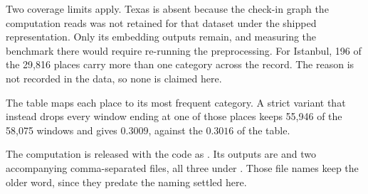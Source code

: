 Two coverage limits apply. Texas is absent because the check-in graph the computation reads was not
retained for that dataset under the shipped representation. Only its embedding outputs remain, and
measuring the benchmark there would require re-running the preprocessing. For Istanbul, 196 of the 29,816 places carry more than one category across the
record. The reason is not recorded in the data, so none is claimed here.
%

The table maps each place to its most frequent category. A strict variant
that instead drops every window ending at one of those places keeps 55,946 of the 58,075 windows
and gives $0.3009$, against the $0.3016$ of the table.

The computation is released with the code as
. Its outputs are
 and two accompanying comma-separated files, all three under
. Those file names keep the older word, since they
predate the naming settled here.
